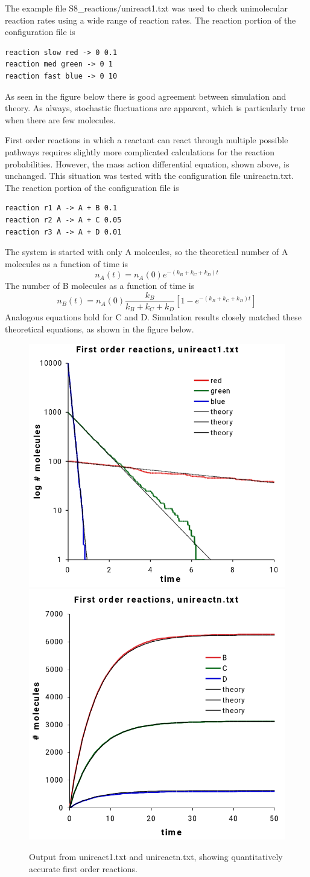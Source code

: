 \documentclass {scrbook}
\begin{document}
The example file S8\_reactions/unireact1.txt was used to check unimolecular reaction rates using a wide range of reaction rates. The reaction portion of the configuration file is

\begin{lstlisting}[style=SSAC]
reaction slow red -> 0 0.1
reaction med green -> 0 1
reaction fast blue -> 0 10
\end{lstlisting}
As seen in the figure below there is good agreement between simulation and theory. As always, stochastic fluctuations are apparent, which is particularly true when there are few molecules.

First order reactions in which a reactant can react through multiple possible pathways requires slightly more complicated calculations for the reaction probabilities. However, the mass action differential equation, shown above, is unchanged. This situation was tested with the configuration file unireactn.txt. The reaction portion of the configuration file is

\begin{lstlisting}[style=SSAC]
reaction r1 A -> A + B 0.1
reaction r2 A -> A + C 0.05
reaction r3 A -> A + D 0.01
\end{lstlisting}
The system is started with only A molecules, so the theoretical number of A molecules as a function of time is
$$n_A(t) = n_A(0) e^{-(k_B+k_C+k_D)t}$$
The number of B molecules as a function of time is
$$n_B(t) = n_A(0) \frac{k_B}{k_B+k_C+k_D} \left[1-e^{-(k_B+k_C+k_D)t} \right]$$
Analogous equations hold for C and D. Simulation results closely matched these theoretical equations, as shown in the figure below.

\begin{figure}[h]
\centering
\includegraphics[height=5 cm]{figures/image34.png}
\includegraphics[height=5 cm]{figures/image35.png}
\caption{Output from unireact1.txt and unireactn.txt, showing quantitatively accurate first order reactions.}
\label{fig:unireact1}
\end{figure}
\end{document}

